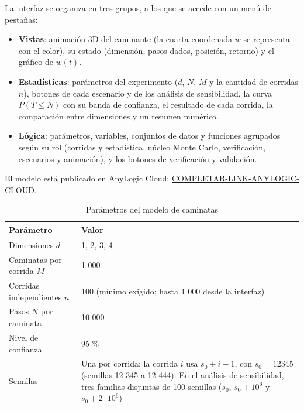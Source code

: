 \documentclass{article}
\begin{document}
La interfaz se organiza en tres grupos, a los que se accede con un menú de pestañas:
\begin{itemize}
    \item \textbf{Vistas}: animación 3D del caminante (la cuarta coordenada $w$ se representa con el color), su estado (dimensión, pasos dados, posición, retorno) y el gráfico de $w(t)$.
    \item \textbf{Estadísticas}: parámetros del experimento ($d$, $N$, $M$ y la cantidad de corridas $n$), botones de cada escenario y de los análisis de sensibilidad, la curva $P(T\leq N)$ con su banda de confianza, el resultado de cada corrida, la comparación entre dimensiones y un resumen numérico.
    \item \textbf{Lógica}: parámetros, variables, conjuntos de datos y funciones agrupados según su rol (corridas y estadística, núcleo Monte Carlo, verificación, escenarios y animación), y los botones de verificación y validación.
\end{itemize}
El modelo está publicado en AnyLogic Cloud: \url{COMPLETAR-LINK-ANYLOGIC-CLOUD}.

\begin{table}[h]
\centering
\renewcommand{\arraystretch}{1.3}
\caption{Parámetros del modelo de caminatas}
\begin{tabularx}{\textwidth}{ | Y | Y | }
    \hline
    \textbf{Parámetro} & \textbf{Valor} \\
    \hline
    Dimensiones $d$ & 1, 2, 3, 4 \\
    \hline
    Caminatas por corrida $M$ & 1 000 \\
    \hline
    Corridas independientes $n$ & 100 (mínimo exigido; hasta 1 000 desde la interfaz) \\
    \hline
    Pasos $N$ por caminata & 10 000 \\
    \hline
    Nivel de confianza & 95 \% \\
    \hline
    Semillas & Una por corrida: la corrida $i$ usa $s_0+i-1$, con $s_0=12345$ (semillas 12 345 a 12 444). En el análisis de sensibilidad, tres familias disjuntas de 100 semillas ($s_0$, $s_0+10^6$ y $s_0+2\cdot10^6$) \\
    \hline
\end{tabularx}
\end{table}
\end{document}
